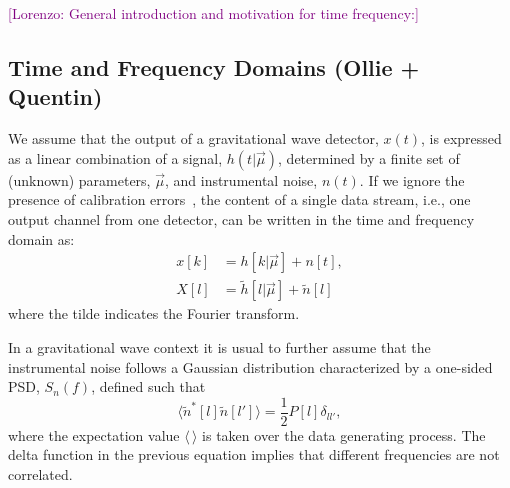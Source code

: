 \documentclass[%
 reprint,
superscriptaddress,
nofootinbib,
 amsmath,amssymb,
 aps,
colorlinks = true, 
linkcolor = blue, 
urlcolor = blue, 
citecolor = blue, 
anchorcolor = blue,
]{revtex4-2}
\newcommand{\ls}[1]{\textcolor{purple}{[Lorenzo: #1]}}
\begin{document}
\ls{General introduction and motivation for time frequency:}





\subsection{Time and Frequency Domains (Ollie + Quentin)}


We assume that the output of a gravitational wave detector, $x(t)$, is expressed as a linear combination of a signal, $h(t| \vec{\mu})$, determined by a finite set of (unknown) parameters, $\vec{\mu}$, and instrumental noise, $n(t)$. If we ignore the presence of calibration errors~\cite{Savalle_2022}, the content of a single data stream, i.e., one output channel from one detector, can be written in the time and frequency domain as:
\begin{align}
{x}[k] & = h[k|\vec{\mu}]+ n[t],\\
X[l]& = \tilde{h}[l|\vec{\mu}]+ \tilde{n}[l]
\end{align}
%
where the tilde indicates the Fourier transform. 

In a gravitational wave context it is usual to further assume that the instrumental noise follows a Gaussian distribution characterized by a one-sided PSD, $S_n(f)$, defined such that
\begin{equation}\label{eq:psd_definition}
 \langle \tilde{n}^*[l] \tilde{n}[l'] \rangle = \frac{1}{2} P[l] \delta_{ll'},
\end{equation}
%
where the expectation value $\langle \, \rangle$ is taken over the data generating process. The delta function in the previous equation implies that different frequencies are not correlated.
\end{document}
